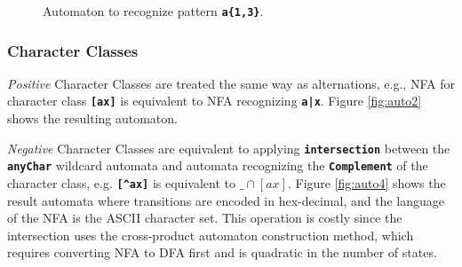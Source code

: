 \begin{figure}[H]
\centering
{}
\caption{Automaton to recognize pattern \texttt{\textbf{a\{1,3\}}}.}
\label{fig:autoq4}
\end{figure}


\subsubsection{Character Classes}
\textit{Positive} Character Classes are treated the same way as alternations, e.g., NFA for character class \texttt{\textbf{[ax]}} is equivalent to NFA recognizing \texttt{\textbf{a|x}}. Figure \ref{fig:auto2} shows the resulting automaton.

\textit{Negative} Character Classes are equivalent to applying \texttt{\textbf{intersection}} between the \texttt{\textbf{anyChar}} wildcard automata and automata recognizing the \texttt{\textbf{Complement}} of the character class, e.g. \texttt{\textbf{[\textasciicircum ax]}} is equivalent to \texttt{\textbf{$\_ \cap [ax]$}}. Figure \ref{fig:auto4} shows the result automata where transitions are encoded in hex-decimal, and the language of the NFA is the ASCII character set. This operation is costly since the intersection uses the cross-product automaton construction method, which requires converting NFA to DFA first and is quadratic in the number of states.


